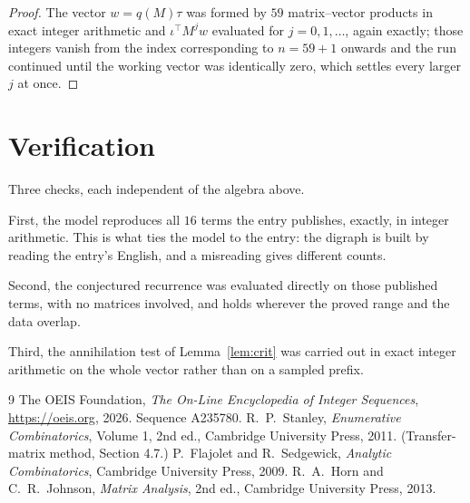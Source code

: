 \documentclass[11pt,a4paper]{article}
\theoremstyle{plain}
\theoremstyle{definition}
\begin{document}
\begin{proof}
The vector $w=q(M)\tau$ was formed by $59$ matrix--vector products in exact integer
arithmetic and $\iota^{\!\top}M^{j}w$ evaluated for $j=0,1,\dots$, again exactly; those
integers vanish from the index corresponding to $n=59+1$ onwards and the run continued
until the working vector was identically zero, which settles every larger $j$ at once.
\end{proof}

\section{Verification}

Three checks, each independent of the algebra above.

First, the model reproduces all $16$ terms the entry publishes, exactly, in integer
arithmetic. This is what ties the model to the entry: the digraph is built by reading the
entry's English, and a misreading gives different counts.

Second, the conjectured recurrence was evaluated directly on those published terms, with no
matrices involved, and holds wherever the proved range and the data overlap.

Third, the annihilation test of Lemma~\ref{lem:crit} was carried out in exact integer
arithmetic on the whole vector rather than on a sampled prefix.

\begin{thebibliography}{9}
 The OEIS Foundation, \emph{The On-Line Encyclopedia of Integer
Sequences}, \url{https://oeis.org}, 2026. Sequence A235780.
 R.~P.~Stanley, \emph{Enumerative Combinatorics}, Volume 1, 2nd ed.,
Cambridge University Press, 2011. (Transfer-matrix method, Section 4.7.)
 P.~Flajolet and R.~Sedgewick, \emph{Analytic Combinatorics}, Cambridge
University Press, 2009.
 R.~A.~Horn and C.~R.~Johnson, \emph{Matrix Analysis}, 2nd ed., Cambridge
University Press, 2013.
\end{thebibliography}
\end{document}
